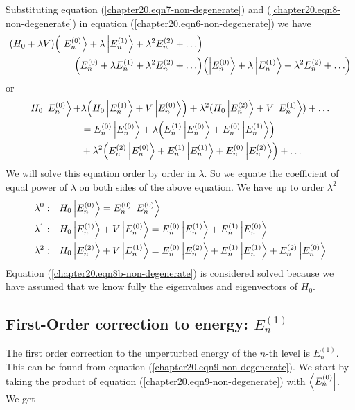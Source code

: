 Substituting equation (\ref{chapter20.eqn7-non-degenerate}) and (\ref{chapter20.eqn8-non-degenerate}) in equation (\ref{chapter20.eqn6-non-degenerate}) we have
\begin{align*}
\qty(H_0 + \lambda V)\qty(\ket{E_n^{(0)}} + \lambda \ket{E_n^{(1)}} + \lambda^2 E_n^{(2)} + \ldots)& \\
= \qty(E_n^{(0)} + \lambda E_n^{(1)} + \lambda^2 E_n^{(2)} + \ldots)
&\qty(\ket{E_n^{(0)}} + \lambda \ket{E_n^{(1)}}
+ \lambda^2 E_n^{(2)} + \ldots)
\end{align*}
or
\begin{align*}
H_0 \ket{E_n^{(0)}} + &\lambda \qty(H_0 \ket{E_n^{(1)}}  + V\ket{E_n^{(0)}})  + \lambda^2(H_0 \ket{E_n^{(2)}} + V\ket{E_n^{(1)}}) + \ldots  \\
&= E_n^{(0)} \ket{E_n^{(0)}} + \lambda\qty(E_n^{(1)}\ket{E_n^{(0)}} + E_n^{(0)}\ket{E_n^{(1)}})  \\
&+ \lambda^2 \qty(E_n^{(2)} \ket{E_n^{(0)}}  + E_n^{(1)}\ket{E_n^{(1)}}  +  E_n^{(0)}\ket{E_n^{(2)}}) + \ldots
\end{align*}
We will solve this equation order by order in $\lambda$. So we equate the coefficient of equal power of $\lambda$ on both sides of the above equation. We  have up to order $\lambda^2$
\begin{align}
\label{chapter20.eqn8b-non-degenerate}
\lambda^0 : \quad &  H_0 \ket{E_{n}^{(0)}} = E_n^{(0)}\ket{E_{n}^{(0)}} \\
\label{chapter20.eqn9-non-degenerate}
\lambda^1 : \quad & H_0\ket{E_{n}^{(1)}} + V\ket{E_{n}^{(0)}} = E_n^{(0)}\ket{E_{n}^{(1)}} + E_n^{(1)}\ket{E_{n}^{(0)}} \\
\label{chapter20.eqn10-non-degenerate}
\lambda^2 : \quad & H_0\ket{E_n^{(2)}} + V\ket{E_{n}^{(1)}} = E_n^{(0)}\ket{E_{n}^{(2)}} + E_{n}^{(1)}\ket{E_{n}^{(1)}}  + E_{n}^{(2)}\ket{E_{n}^{(0)}}
\end{align}
Equation (\ref{chapter20.eqn8b-non-degenerate}) is considered solved because we have assumed that we know fully the eigenvalues and eigenvectors of $H_0$.

\subsection{First-Order correction to energy: \texorpdfstring{$E_n^{(1)}$}{PDFstring}}
The first order correction to the unperturbed energy of the $n$-th level is $E_n^{(1)}$. This can be found from equation (\ref{chapter20.eqn9-non-degenerate}). We start by taking the product of equation (\ref{chapter20.eqn9-non-degenerate}) with $\bra{E_n^{(0)}}$. We get

